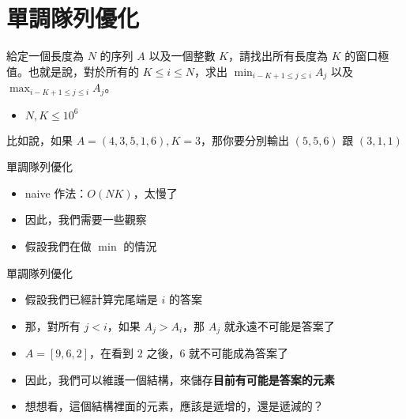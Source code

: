 \documentclass[standalone]{beamer}
\begin{document}
\section{單調隊列優化}

\begin{frame}{}
  \begin{problem}
    給定一個長度為 $N$ 的序列 $A$ 以及一個整數 $K$，請找出所有長度為 $K$ 的窗口極值。也就是說，對於所有的 $K \leq i \leq N$，求出 $\min_{i - K + 1 \leq j \leq i}A_j$ 以及 $\max_{i - K + 1 \leq j \leq i}A_j$。

    \begin{itemize}
      \item $N, K \leq 10^6$
    \end{itemize}

    比如說，如果 $A = (4, 3, 5, 1, 6), K = 3$，那你要分別輸出 $(5, 5, 6)$ 跟 $(3, 1, 1)$
  \end{problem}
\end{frame}

\begin{frame}{單調隊列優化}
  \begin{itemize}
    \item naive 作法：$O(NK)$，太慢了
    \item 因此，我們需要一些觀察
    \item 假設我們在做 $\min$ 的情況
  \end{itemize}
\end{frame}

\begin{frame}{單調隊列優化}
  \begin{itemize}
    \item 假設我們已經計算完尾端是 $i$ 的答案
    \item 那，對所有 $j < i$，如果 $A_j > A_i$，那 $A_j$ 就永遠不可能是答案了
    \item $A = [9, 6, 2]$，在看到 $2$ 之後，$6$ 就不可能成為答案了
    \item 因此，我們可以維護一個結構，來儲存\textbf{目前有可能是答案的元素}
    \item 想想看，這個結構裡面的元素，應該是遞增的，還是遞減的？
  \end{itemize}
\end{frame}
\end{document}
